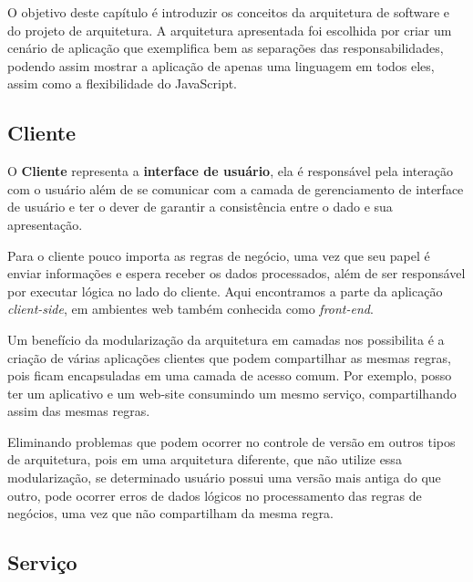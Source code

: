 \documentclass[
	12pt,				%
	openright,			%
	twoside,			%
	a4paper,			%
	english,			%
	brazil				%
	]{abntex2}
\begin{document}

O objetivo deste capítulo é introduzir os conceitos da arquitetura de software e do projeto de arquitetura. A arquitetura apresentada foi escolhida por criar um cenário de aplicação que exemplifica bem as separações das responsabilidades, podendo assim mostrar a aplicação de apenas uma linguagem em todos eles, assim como a flexibilidade do JavaScript.

\subsection{Cliente}
\label{subsec:Cliente}

O \textbf{Cliente} representa a \textbf{interface de usuário}, ela é responsável pela interação com o usuário além de se comunicar com a camada de gerenciamento de interface de usuário e ter o dever de garantir a consistência entre o dado e sua apresentação.

Para o cliente pouco importa as regras de negócio, uma vez que seu papel é enviar informações e espera receber os dados processados, além de ser responsável por executar lógica no lado do cliente. Aqui encontramos a parte da aplicação \textit{client-side}, em ambientes web também conhecida como \textit{front-end}.

Um benefício da modularização da arquitetura em camadas nos possibilita é a criação de várias aplicações clientes que podem compartilhar as mesmas regras, pois ficam encapsuladas em uma camada de acesso comum. Por exemplo, posso ter um aplicativo e um web-site consumindo um mesmo serviço, compartilhando assim das mesmas regras.

Eliminando problemas que podem ocorrer no controle de versão em outros tipos de arquitetura, pois em uma arquitetura diferente, que não utilize essa modularização, se determinado usuário possui uma versão mais antiga do que outro, pode ocorrer erros de dados lógicos no processamento das regras de negócios, uma vez que não compartilham da mesma regra.

\subsection{Serviço}
\label{subsec:Servico}
\end{document}
